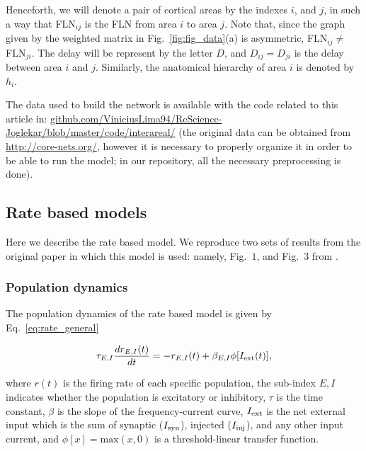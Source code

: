 Henceforth, we will denote a pair of cortical areas by the indexes $i$, and $j$, in such a way that FLN$_{ij}$ is the FLN from area $i$ to area $j$. Note that, since the graph given by the weighted matrix in Fig.~\ref{fig:fig_data}(a) is asymmetric, FLN$_{ij} \ne $ FLN$_{ji}$. The delay will be represent by the letter $D$, and $D_{ij} = D_{ji}$ is the delay between area $i$ and $j$. Similarly, the anatomical hierarchy of area $i$ is denoted by $h_{i}$.


The data used to build the network is available with the code related to this article in: \href{github.com/ViniciusLima94/ReScience-Joglekar/blob/master/code/interareal/}{github.com/ViniciusLima94/ReScience-Joglekar/blob/master/code/interareal/} (the original data can be obtained from
\href{core-nets.org/}{http://core-nets.org/}, however it is necessary to properly organize it in order to be able to run the model; in our repository, all the necessary preprocessing is done).

\subsection{Rate based models}\label{rate_model}

Here we describe the rate based model. We reproduce two sets of results from the original paper in which this model is used: namely, Fig.~$1$, and Fig.~$3$ from \cite{joglekar2018inter}.

\subsubsection{Population dynamics}\label{rate_pop}

The population dynamics of the rate based model is given by Eq.~\ref{eq:rate_general}

\begin{equation}
    \tau_{E,I}\frac{dr_{E,I}(t)}{dt} = -r_{E,I}(t) + \beta_{E,I}\phi[I_{\rm ext}(t)],
    \label{eq:rate_general}
\end{equation}

\noindent where $r(t)$ is the firing rate of each specific population, the sub-index $E,I$ indicates whether the population is excitatory or inhibitory, $\tau$ is the time constant, $\beta$ is the slope of the frequency-current curve, $I_{\rm ext}$ is the net external input which is the sum of synaptic ($I_{\rm syn}$), injected ($I_{\rm inj}$), and any other input current, and $\phi[x] = \text{max}(x,0)$ is a threshold-linear transfer function.

